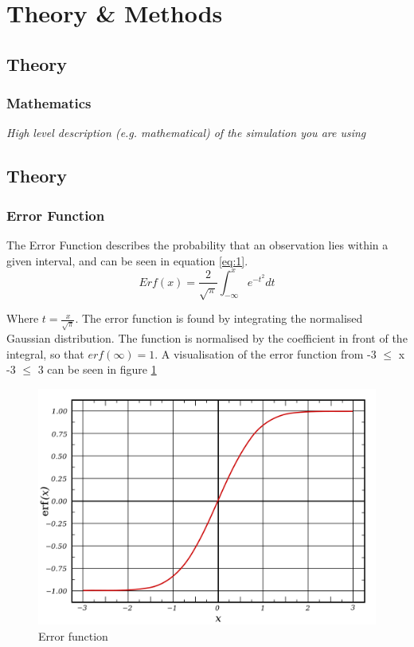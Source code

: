 \section{Theory \& Methods}
\subsection{Theory}
\subsubsection{Mathematics}
\textit{High level description (e.g. mathematical) of the simulation you are using}

\subsection{Theory}

\subsubsection{Error Function}
The Error Function describes the probability that an observation lies within
a given interval, and can be seen in equation \ref{eq:1}.
\begin{equation} \label{eq:1}
    Erf(x)=\frac{2}{\sqrt{\pi}} \int_{-\infty}^x e^{-t^2} dt
\end{equation}

Where \(t=\frac{x}{\sqrt{\pi}}\). The error function is found by integrating
the normalised Gaussian distribution. The function is normalised by the
coefficient in front of the integral, so that \(erf(\infty) = 1\).
A visualisation of the error function from -3 $\leq$ x -3 $\leq$ 3 can be seen
in figure \ref{figure:error_function}

\begin{figure}[ht]
    \centering
    \includegraphics[scale=0.3]{images/error_function.png}
    \caption{Error function}
    \label{figure:error_function}
\end{figure}

